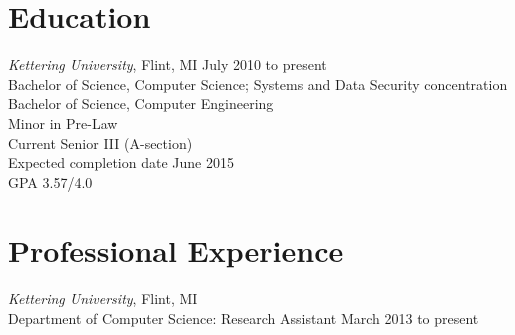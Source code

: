 \documentclass{res}
\begin{document}
\thispagestyle{empty} %

\address{PO Box 320426~\textperiodcentered~Flint, MI 48532~\textperiodcentered~+1 909 278 7753~\textperiodcentered~alisonc@alisonc.net
}      

\begin{resume}
 
 
\vspace{0.1in}
\section{Education} 
\vspace{8pt} 
    {\sl Kettering University}, Flint, MI \hfill July 2010 to present\\
    Bachelor of Science, Computer Science; Systems and Data Security concentration\\
    Bachelor of Science, Computer Engineering\\
    Minor in Pre-Law\\
    Current Senior III (A-section)\\
    Expected completion date June 2015\\
    GPA 3.57/4.0
    
  
\vspace{0.1in} 
\section{Professional Experience} 
\vspace{8pt} 
{\sl Kettering University}, Flint, MI \\
Department of Computer Science: Research Assistant \hfill March 2013 to present


\end{resume}
\end{document}
